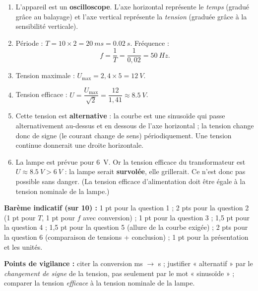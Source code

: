 \documentclass[11pt]{article}
\begin{document}
\begin{corrige}
\begin{enumerate}
\item L'appareil est un \textbf{oscilloscope}. L'axe horizontal représente le \emph{temps} (gradué grâce au balayage) et l'axe vertical représente la \emph{tension} (graduée grâce à la sensibilité verticale).
\item Période : $T = 10 \times 2 = \SI{20}{ms} = \SI{0,02}{s}$. Fréquence :
\[ f = \frac{1}{T} = \frac{1}{0{,}02} = \SI{50}{Hz}. \]
\item Tension maximale : $U_{\max} = 2{,}4 \times 5 = \SI{12}{V}$.
\item Tension efficace : $U = \dfrac{U_{\max}}{\sqrt{2}} = \dfrac{12}{1{,}41} \approx \SI{8,5}{V}$.
\item Cette tension est \textbf{alternative} : la courbe est une sinusoïde qui passe alternativement au-dessus et en dessous de l'axe horizontal ; la tension change donc de signe (le courant change de sens) périodiquement. Une tension continue donnerait une droite horizontale.
\item La lampe est prévue pour \SI{6}{V}. Or la tension efficace du transformateur est $U \approx \SI{8,5}{V} > \SI{6}{V}$ : la lampe serait \textbf{survolée}, elle grillerait. Ce n'est donc pas possible sans danger. (La tension efficace d'alimentation doit être égale à la tension nominale de la lampe.)
\end{enumerate}
\textbf{Barème indicatif (sur 10) :} 1 pt pour la question 1 ; 2 pts pour la question 2 (1 pt pour $T$, 1 pt pour $f$ avec conversion) ; 1 pt pour la question 3 ; 1,5 pt pour la question 4 ; 1,5 pt pour la question 5 (allure de la courbe exigée) ; 2 pts pour la question 6 (comparaison de tensions + conclusion) ; 1 pt pour la présentation et les unités.

\textbf{Points de vigilance :} citer la conversion ms $\to$ s ; justifier « alternatif » par le \emph{changement de signe} de la tension, pas seulement par le mot « sinusoïde » ; comparer la tension \emph{efficace} à la tension nominale de la lampe.
\end{corrige}
\end{document}

